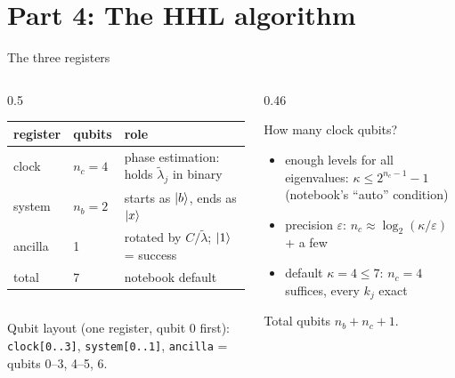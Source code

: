 \documentclass[aspectratio=169,11pt]{beamer}
\newcommand{\lt}{\tilde\lambda}
\begin{document}
\section{Part 4: The HHL algorithm}
\begin{frame}{The three registers}
  \begin{columns}[T]
    \begin{column}{0.5\textwidth}
      \footnotesize
      \begin{tabular}{p{1.3cm}p{1.1cm}p{3.1cm}}
        \toprule register & qubits & role\\ \midrule
        clock & $n_c = 4$ & phase estimation: holds $\lt_j$ in binary\\
        system & $n_b = 2$ & starts as $\ket b$, ends as $\ket x$\\
        ancilla & 1 & rotated by $C/\lt$; $\ket1$ = success\\ \midrule
        total & 7 & notebook default\\ \bottomrule
      \end{tabular}\\[2mm]
      \small Qubit layout (one register, qubit 0 first): \texttt{clock[0..3]}, \texttt{system[0..1]}, \texttt{ancilla} = qubits 0--3, 4--5, 6.
    \end{column}
    \begin{column}{0.46\textwidth}
      \begin{block}{How many clock qubits?}
        \begin{itemize}
          \item enough levels for all eigenvalues: $\kappa \le 2^{n_c-1} - 1$ (notebook's ``auto'' condition)
          \item precision $\varepsilon$: $n_c \approx \log_2(\kappa/\varepsilon)$ + a few
          \item default $\kappa = 4 \le 7$: $n_c = 4$ suffices, every $k_j$ exact
        \end{itemize}
      \end{block}
      \small Total qubits $n_b + n_c + 1$.
    \end{column}
  \end{columns}
\end{frame}
\end{document}
